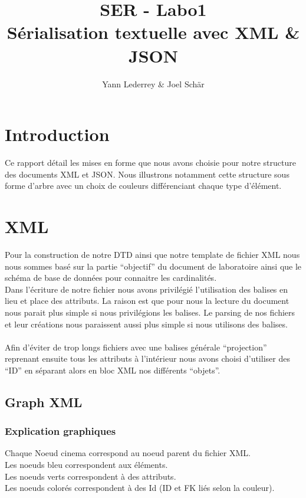 \documentclass[a4paper]{article}
\title{SER - Labo1 \\ Sérialisation textuelle avec XML \& JSON}
\author{Yann Lederrey \& Joel Schär}
\begin{document}
\maketitle
\pagebreak

\tableofcontents
\pagebreak

\section{Introduction}
Ce rapport détail les mises en forme que nous avons choisie pour notre structure des documents XML et JSON. Nous illustrons notamment cette structure sous forme d'arbre avec un choix de couleurs différenciant chaque type d'élément.

\section{XML}
Pour la construction de notre DTD ainsi que notre template de fichier XML nous nous sommes basé sur la partie ``objectif'' du document de laboratoire ainsi que le schéma de base de données pour connaitre les cardinalités.\\
Dans l'écriture de notre fichier nous avons privilégié l'utilisation des balises en lieu et place des attributs. La raison est que pour nous la lecture du document nous parait plus simple si nous privilégions les balises. Le parsing de nos fichiers et leur créations nous paraissent aussi plus simple si 
nous utilisons des balises.\\
\\
Afin d'éviter de trop longs fichiers avec une balises générale ``projection'' reprenant ensuite tous les attributs à l'intérieur nous avons choisi d'utiliser des ``ID'' en séparant alors en bloc XML nos différents ``objets''.
\subsection{Graph XML}
\subsubsection{Explication graphiques}
Chaque Noeud cinema correspond au noeud parent du fichier XML.\\
Les noeuds bleu correspondent aux éléments.\\
Les noeuds verts correspondent à des attributs.\\
Les noeuds colorés correspondent à des Id (ID et FK liés selon la couleur).
\end{document}
